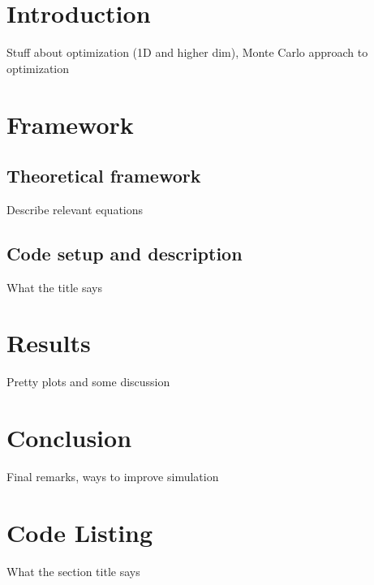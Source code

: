 
\def\HWnum{Project 1}
\def\duedate{September 25, 2024}




\section{Introduction}

Stuff about optimization (1D and higher dim), Monte Carlo approach to optimization

\section{Framework}

\subsection{Theoretical framework}

Describe relevant equations

\subsection{Code setup and description}

What the title says


\section{Results}

Pretty plots and some discussion


\section{Conclusion}

Final remarks, ways to improve simulation


\appendix

\section{Code Listing}

What the section title says

    

